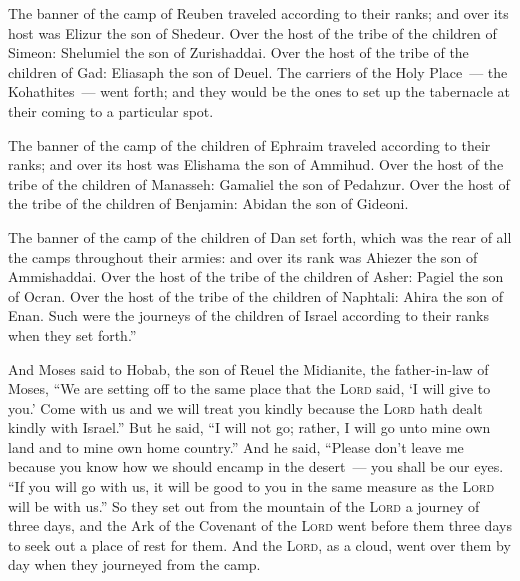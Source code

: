 \begin{inparaenum}
   The banner of the camp of Reuben traveled according to their ranks; and over its host was Elizur the son of Shedeur.%
   Over the host of the tribe of the children of Simeon: Shelumiel the son of Zurishaddai.%
   Over the host of the tribe of the children of Gad: Eliasaph the son of Deuel.%
   The carriers of the Holy Place~--- the Kohathites~--- went forth; and they would be the ones to set up the tabernacle at their coming to a particular spot.%
  
   The banner of the camp of the children of Ephraim traveled according to their ranks; and over its host was Elishama the son of Ammihud.%
   Over the host of the tribe of the children of Manasseh: Gamaliel the son of Pedahzur.%
   Over the host of the tribe of the children of Benjamin: Abidan the son of Gideoni.%
  
   The banner of the camp of the children of Dan set forth, which was the rear of all the camps throughout their armies: and over its rank was Ahiezer the son of Ammishaddai.%
   Over the host of the tribe of the children of Asher: Pagiel the son of Ocran.%
   Over the host of the tribe of the children of Naphtali: Ahira the son of Enan.%
   Such were the journeys of the children of Israel according to their ranks when they set forth.''%
  
   And Moses said to Hobab, the son of Reuel the Midianite, the father-in-law of Moses, ``We are setting off to the same place that the \textsc{Lord} said, `I will give to you.' Come with us and we will treat you kindly because the \textsc{Lord} hath dealt kindly with Israel.''%
   But he said, ``I will not go; rather, I will go unto mine own land and to mine own home country.''%
   And he said, ``Please don't leave me because you know how we should encamp in the desert~--- you shall be our eyes.%
   ``If you will go with us, it will be good to you in the same measure as the \textsc{Lord} will be with us.''%
   So they set out from the mountain of the \textsc{Lord} a journey of three days, and the Ark of the Covenant of the \textsc{Lord} went before them three days to seek out a place of rest for them.%
   And the \textsc{Lord}, as a cloud, went over them by day when they journeyed from the camp.%
  

\end{inparaenum}
